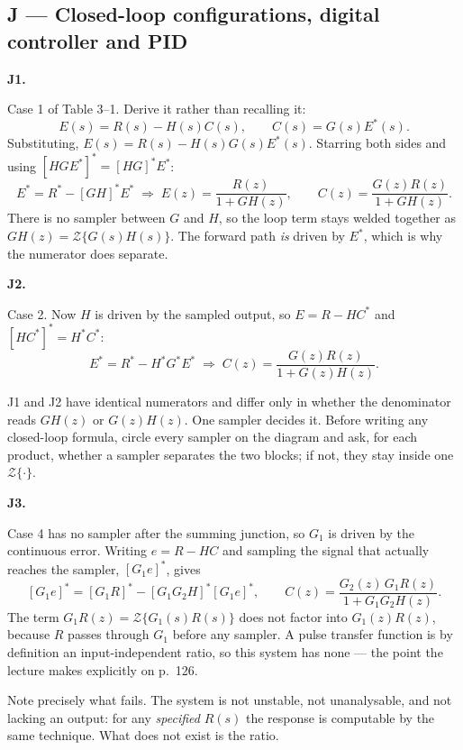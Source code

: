\documentclass[10pt]{article}
\newcommand{\Z}{\mathcal{Z}}
\newcommand{\src}[1]{{\small\color{gray}[PDF pp.~#1]}}
\newcommand{\itemhead}[2]{\par\medskip\noindent\textbf{#1}\quad\src{#2}\par\nopagebreak}
\newcommand{\wrong}[1]{\par\smallskip\noindent{\color{red!55!black}\textbf{If you missed it.}} #1\par}
\begin{document}
\subsection{J --- Closed-loop configurations, digital controller and PID}

\itemhead{J1.}{122--125}
Case 1 of Table 3--1. Derive it rather than recalling it:
\[
E(s)=R(s)-H(s)C(s),\qquad C(s)=G(s)E^{*}(s).
\]
Substituting, \(E(s)=R(s)-H(s)G(s)E^{*}(s)\). Starring both sides and using
\(\left[HGE^{*}\right]^{*}=\left[HG\right]^{*}E^{*}\):
\[
E^{*}=R^{*}-\left[GH\right]^{*}E^{*}
\;\Longrightarrow\;
E(z)=\frac{R(z)}{1+GH(z)},
\qquad
C(z)=\frac{G(z)R(z)}{1+GH(z)} .
\]
There is no sampler between \(G\) and \(H\), so the loop term stays welded together
as \(GH(z)=\Z\{G(s)H(s)\}\). The forward path \emph{is} driven by \(E^{*}\), which is
why the numerator does separate.

\itemhead{J2.}{124--125}
Case 2. Now \(H\) is driven by the sampled output, so \(E=R-HC^{*}\) and
\(\left[HC^{*}\right]^{*}=H^{*}C^{*}\):
\[
E^{*}=R^{*}-H^{*}G^{*}E^{*}
\;\Longrightarrow\;
C(z)=\frac{G(z)R(z)}{1+G(z)H(z)} .
\]
\wrong{J1 and J2 have identical numerators and differ only in whether the denominator
reads \(GH(z)\) or \(G(z)H(z)\). One sampler decides it. Before writing any
closed-loop formula, circle every sampler on the diagram and ask, for each product,
whether a sampler separates the two blocks; if not, they stay inside one \(\Z\{\cdot\}\).}

\itemhead{J3.}{125--126}
Case 4 has no sampler after the summing junction, so \(G_{1}\) is driven by the
continuous error. Writing \(e=R-HC\) and sampling the signal that actually reaches
the sampler, \(\left[G_{1}e\right]^{*}\), gives
\[
\left[G_{1}e\right]^{*}=\left[G_{1}R\right]^{*}-\left[G_{1}G_{2}H\right]^{*}\left[G_{1}e\right]^{*},
\qquad
C(z)=\frac{G_{2}(z)\,G_{1}R(z)}{1+G_{1}G_{2}H(z)} .
\]
The term \(G_{1}R(z)=\Z\{G_{1}(s)R(s)\}\) does not factor into \(G_{1}(z)R(z)\),
because \(R\) passes through \(G_{1}\) before any sampler. A pulse transfer function
is by definition an input-independent ratio, so this system has none --- the point
the lecture makes explicitly on p.~126.
\wrong{Note precisely what fails. The system is not unstable, not unanalysable, and
not lacking an output: for any \emph{specified} \(R(s)\) the response is computable
by the same technique. What does not exist is the ratio.}
\end{document}
